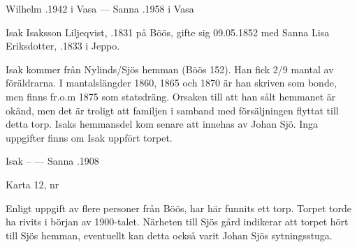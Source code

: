 Wilhelm .1942 i Vasa  ---  Sanna .1958 i Vasa


Isak Isaksson Liljeqvist, .1831 på Böös, gifte sig 09.05.1852 med Sanna Lisa Eriksdotter,  .1833 i Jeppo.
\begin{jhchildren}
  \item {}
  \item {}
  \item {}
  \item {}
  \item {}
  \item {}
  \item {}
  \item {}
  \item {}
  \item {}
\end{jhchildren}
Isak kommer från Nylinds/Sjös hemman (Böös 152). Han fick 2/9 mantal av föräldrarna. I mantalslängder 1860, 1865 och 1870 är han skriven som bonde, men finns fr.o.m 1875 som statsdräng. Orsaken till att han sålt hemmanet är okänd, men det är troligt att familjen i samband med försäljningen flyttat till detta torp. Isaks hemmansdel kom senare att innehas av Johan Sjö. Inga uppgifter finns om Isak uppfört torpet.

Isak --  ---  Sanna .1908


Karta 12,   nr 

Enligt uppgift av flere personer från Böös, har här funnits ett torp. Torpet torde ha rivits i början av 1900-talet. Närheten till Sjös gård indikerar att torpet hört till Sjös hemman, eventuellt kan detta också varit Johan Sjös sytningsstuga.


